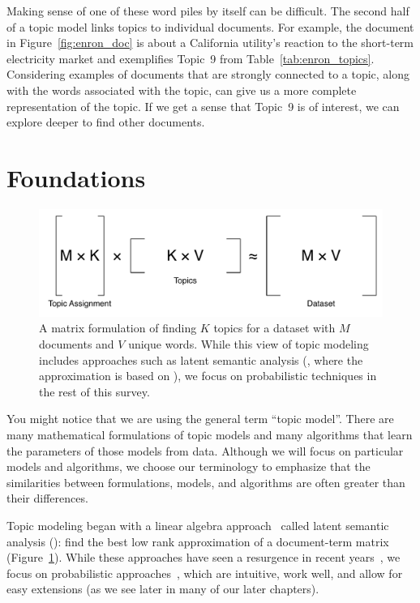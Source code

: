 Making sense of one of these word piles by itself can be difficult.
The second half of a topic model links topics to individual documents.
For example, the document in
Figure~\ref{fig:enron_doc} is about a California utility's reaction to
the short-term electricity market and exemplifies Topic~9 from
Table~\ref{tab:enron_topics}.
Considering examples of documents that are strongly connected to a topic, along with the words associated with the topic, can give us a more complete representation of the topic.
If we get a sense that Topic~9 is of
interest, we can explore deeper to find other documents.

\section{Foundations}

\begin{center}
\begin{figure}
  \begin{center}
  \includegraphics[width=.8\linewidth]{figures/matrix_factorization}
  \end{center}

  \caption{A matrix formulation of finding $K$ topics for a dataset
    with $M$ documents and $V$ unique words.  While this view of topic
    modeling includes approaches such as latent semantic analysis
    (, where the approximation is based on ), we
    focus on probabilistic techniques in the rest of this survey.}
  \label{fig:matrix_topics}
\end{figure}
\end{center}


You might notice that we are using the general term ``topic model''.
There are many mathematical formulations of topic models and many algorithms that learn the parameters of those models from data.
Although we will focus on particular models and algorithms, we choose our terminology to emphasize that the similarities between formulations, models, and algorithms are often greater than their differences.



Topic modeling began with a linear algebra approach~\citep{deerwester-90} called
latent semantic analysis (): find the best low rank approximation of a
document-term matrix (Figure~\ref{fig:matrix_topics}).  While these approaches
have seen a resurgence in recent years~\citep{anandkumar-12,arora-13}, we
focus on probabilistic approaches~\citep{hofmann-99,papadimitriou-00,blei-03},
which are intuitive, work well, and allow for
easy extensions (as we see later in many of our later chapters).



